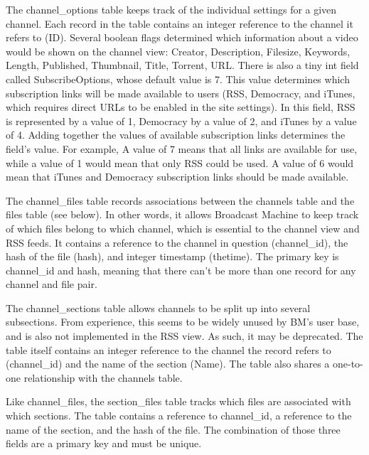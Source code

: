 \documentclass[a4paper,12pt]{report}
\begin{document}
	The channel_options table keeps track of the individual settings for a given channel. Each record in the table contains an integer reference to the channel it refers to (ID). Several boolean flags determined which information about a video would be shown on the channel view: Creator, Description, Filesize, Keywords, Length, Published, Thumbnail, Title, Torrent, URL. There is also a tiny int field called SubscribeOptions, whose default value is 7. This value determines which subscription links will be made available to users (RSS, Democracy, and iTunes, which requires direct URLs to be enabled in the site settings). In this field, RSS is represented by a value of 1, Democracy by a value of 2, and iTunes by a value of 4. Adding together the values of available subscription links determines the field's value. For example, A value of 7 means that all links are available for use, while a value of 1 would mean that only RSS could be used. A value of 6 would mean that iTunes and Democracy subscription links should be made available. 

	The channel_files table records associations between the channels table and the files table (see below). In other words, it allows Broadcast Machine to keep track of which files belong to which channel, which is essential to the channel view and RSS feeds. It contains a reference to the channel in question (channel_id), the hash of the file (hash), and integer timestamp (thetime). The primary key is channel_id and hash, meaning that there can't be more than one record for any channel and file pair.

	The channel_sections table allows channels to be split up into several subsections. From experience, this seems to be widely unused by BM's user base, and is also not implemented in the RSS view. As such, it may be deprecated. The table itself contains an integer reference to the channel the record refers to (channel_id) and the name of the section (Name). The table also shares a one-to-one relationship with the channels table.

	Like channel_files, the section_files table tracks which files are associated with which sections. The table contains a reference to channel_id, a reference to the name of the section, and the hash of the file. The combination of those three fields are a primary key and must be unique.
\end{document}
